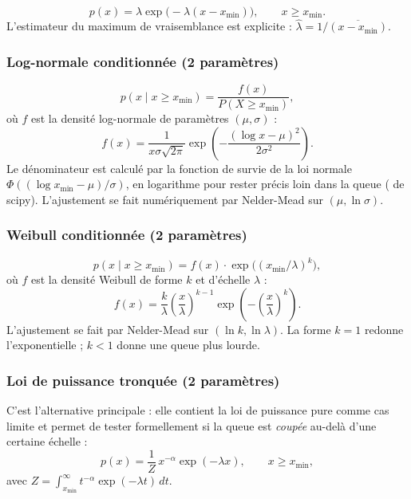 \documentclass[11pt,a4paper]{article}
\theoremstyle{definition}
\newcommand{\code}[1]{\texttt{\detokenize{#1}}}
\begin{document}
\[
  p(x) = \lambda \exp\bigl(-\lambda(x - x_{\min})\bigr), \qquad x \geq x_{\min}.
\]
L'estimateur du maximum de vraisemblance est explicite :
$\hat\lambda = 1/\overline{(x - x_{\min})}$.

\subsubsection{Log-normale conditionnée (2 paramètres)}

\[
  p(x \mid x \geq x_{\min}) = \frac{f(x)}{P(X \geq x_{\min})},
\]
où $f$ est la densité log-normale de paramètres $(\mu, \sigma)$ :
\[
  f(x) = \frac{1}{x \sigma \sqrt{2\pi}} \exp\left(-\frac{(\log x - \mu)^2}{2\sigma^2}\right).
\]
Le dénominateur est calculé par la fonction de survie de la loi normale
$\Phi((\log x_{\min} - \mu)/\sigma)$, en logarithme pour rester précis loin dans
la queue (\code{stats.norm.logsf} de scipy). L'ajustement se fait numériquement
par Nelder-Mead sur $(\mu, \ln\sigma)$.

\subsubsection{Weibull conditionnée (2 paramètres)}

\[
  p(x \mid x \geq x_{\min}) = f(x) \cdot \exp\bigl((x_{\min}/\lambda)^k\bigr),
\]
où $f$ est la densité Weibull de forme $k$ et d'échelle $\lambda$ :
\[
  f(x) = \frac{k}{\lambda} \left(\frac{x}{\lambda}\right)^{k-1}
         \exp\left(-\left(\frac{x}{\lambda}\right)^k\right).
\]
L'ajustement se fait par Nelder-Mead sur $(\ln k, \ln\lambda)$. La forme $k = 1$
redonne l'exponentielle ; $k < 1$ donne une queue plus lourde.

\subsubsection{Loi de puissance tronquée (2 paramètres)}
\label{sec:tronquee}

C'est l'alternative principale : elle contient la loi de puissance pure comme cas
limite et permet de tester formellement si la queue est \emph{coupée} au-delà
d'une certaine échelle :
\begin{equation}
  p(x) = \frac{1}{Z}\, x^{-\alpha} \exp(-\lambda x), \qquad x \geq x_{\min},
  \label{eq:tronquee}
\end{equation}
avec $Z = \int_{x_{\min}}^{\infty} t^{-\alpha} \exp(-\lambda t)\, dt$.
\end{document}
